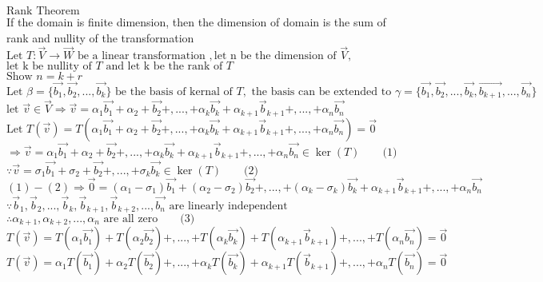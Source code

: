 \documentclass[10pt]{article}
\begin{document}
$\text{Rank Theorem}$\\
If the domain is finite dimension, then the dimension of domain is the sum of rank and nullity of the transformation\\

$\text{Let } T:\vec{V} \rightarrow \vec{W} \text{ be a linear transformation },\text{let n be the dimension of }\vec{V},$\\
$\text{let k be nullity of }T \text{ and let k be the rank of }T$\\
$\text{Show } n = k + r$\\

$\text{Let }\beta = \{ \vec{b_1}, \vec{b_2},...,\vec{b_k}\} \text{ be the basis of kernal of }T, \text{ the basis can be extended to } \gamma = \{ \vec{b_1}, \vec{b_2},...,\vec{b_k}, \vec{b_{k+1}},...,\vec{b_n}\}$\\
$\text{let }\vec{v} \in \vec{V} \Rightarrow \vec{v} = \alpha_1 \vec{b_1} + \alpha_2 + \vec{b_2} +,..., + \alpha_k \vec{b_k} + \alpha_{k+1}\vec{b}_{k+1}+,...,+\alpha_{n}\vec{b_n}$\\
$\text{Let }T(\vec{v}) = T(\alpha_1 \vec{b_1} + \alpha_2 + \vec{b_2} +,..., + \alpha_k \vec{b_k} + \alpha_{k+1}\vec{b}_{k+1}+,...,+\alpha_{n}\vec{b_n}) = \vec{0}$\\
$\Rightarrow \vec{v} = \alpha_1 \vec{b_1} + \alpha_2 + \vec{b_2} +,..., + \alpha_k \vec{b_k} + \alpha_{k+1}\vec{b}_{k+1}+,...,+\alpha_{n}\vec{b_n} \in \ker(T) \quad\quad \text{(1)}$\\
$\because \vec{v} = \sigma_1 \vec{b_1} + \sigma_2 + \vec{b_2} +,..., + \sigma_k \vec{b_k} \in \ker(T) \quad\quad \text{(2)}$\\
$(1) - (2) \Rightarrow \vec{0} = (\alpha_1-\sigma_1)\vec{b_1} + (\alpha_2 - \sigma_2)\vec{b_2}+,...,+ (\alpha_k - \sigma_k)\vec{b_k}+   \alpha_{k+1}\vec{b}_{k+1}+,...,+\alpha_{n}\vec{b_n} $\\
$\because \vec{b}_{1}, \vec{b}_{2},...,\vec{b}_{k},\vec{b}_{k+1}, \vec{b}_{k+2},...,\vec{b_n} \text{ are linearly independent}$\\
$\therefore \alpha_{k+1}, \alpha_{k+2}, ... , \alpha_{n} \text{ are all zero} \quad\quad \text{(3)}$\\
$T(\vec{v}) = T(\alpha_1 \vec{b_1}) + T(\alpha_2 \vec{b_2}) +,..., + T(\alpha_k \vec{b_k}) + T(\alpha_{k+1}\vec{b}_{k+1})+,...,+T(\alpha_{n}\vec{b_n}) = \vec{0}$\\
$T(\vec{v}) = \alpha_1 T(\vec{b_1}) + \alpha_2 T(\vec{b_2}) +,..., + \alpha_k T(\vec{b_k}) + \alpha_{k+1}T(\vec{b}_{k+1})+,...,+\alpha_{n}T(\vec{b_n}) = \vec{0}$\\
\end{document}
